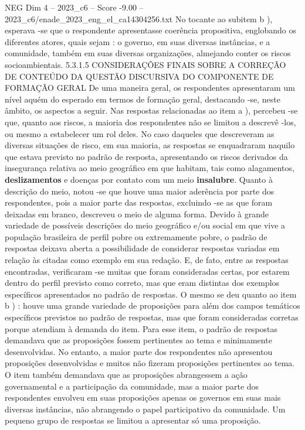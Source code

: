 \begin{textsample}{NEG Dim 4 – 2023\_c6 – Score -9.00 – 2023\_c6/enade\_2023\_eng\_el\_ca14304256.txt}
No tocante ao subitem b ), esperava -se que o respondente apresentasse coerência propositiva, englobando os diferentes atores, quais sejam : o governo, em suas diversas instâncias, e a comunidade, também em suas diversas organizações, almejando conter os riscos socioambientais. 5.3.1.5 CONSIDERAÇÕES FINAIS SOBRE A CORREÇÃO DE CONTEÚDO DA QUESTÃO DISCURSIVA DO COMPONENTE DE FORMAÇÃO GERAL De uma maneira geral, os respondentes apresentaram um nível aquém do esperado em termos de formação geral, destacando -se, neste âmbito, os aspectos a seguir.
Nas respostas relacionadas ao item a ), percebeu -se que, quanto aos riscos, a maioria dos respondentes não se limitou a descrevê -los, ou mesmo a estabelecer um rol deles.
No caso daqueles que descreveram as diversas situações de risco, em sua maioria, as respostas se enquadraram naquilo que estava previsto no padrão de resposta, apresentando os riscos derivados da insegurança relativa ao meio geográfico em que habitam, tais como alagamentos, \textbf{deslizamentos} e doenças por contato com um meio \textbf{insalubre}.
Quanto à descrição do meio, notou -se que houve uma maior aderência por parte dos respondentes, pois a maior parte das respostas, excluindo -se as que foram deixadas em branco, descreveu o meio de alguma forma.
Devido à grande variedade de possíveis descrições do meio geográfico e/ou social em que vive a população brasileira de perfil pobre ou extremamente pobre, o padrão de respostas deixava aberta a possibilidade de considerar respostas variadas em relação às citadas como exemplo em sua redação.
E, de fato, entre as respostas encontradas, verificaram -se muitas que foram consideradas certas, por estarem dentro do perfil previsto como correto, mas que eram distintas dos exemplos específicos apresentados no padrão de respostas.
O mesmo se deu quanto ao item b ) : houve uma grande variedade de proposições para além dos campos temáticos específicos previstos no padrão de respostas, mas que foram consideradas corretas porque atendiam à demanda do item.
Para esse item, o padrão de respostas demandava que as proposições fossem pertinentes ao tema e minimamente desenvolvidas.
No entanto, a maior parte dos respondentes não apresentou proposições desenvolvidas e muitos não fizeram proposições pertinentes ao tema.
O item também demandava que as proposições abrangessem a ação governamental e a participação da comunidade, mas a maior parte dos respondentes envolveu em suas proposições apenas os governos em suas mais diversas instâncias, não abrangendo o papel participativo da comunidade.
Um pequeno grupo de respostas se limitou a apresentar só uma proposição.

\end{textsample}
